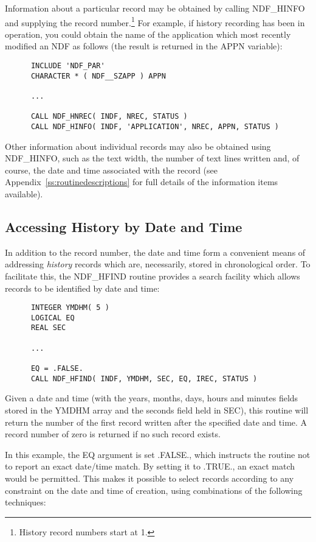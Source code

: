 \documentclass[twoside,11pt]{article}
\newcommand{\htmlref}[2]{#1}
\newcommand{\xlabel}[1]{}
\newcommand{\st}[1]{{\em{#1}}}
\begin{document}
Information about a particular record may be obtained by calling
NDF\_HINFO and supplying the record number.\footnote{History record
numbers start at 1.} For example, if history recording has been in
operation, you could obtain the name of the application which most
recently modified an NDF as follows (the result is returned in the
APPN variable):

\small
\begin{verbatim}
      INCLUDE 'NDF_PAR'
      CHARACTER * ( NDF__SZAPP ) APPN

      ...

      CALL NDF_HNREC( INDF, NREC, STATUS )
      CALL NDF_HINFO( INDF, 'APPLICATION', NREC, APPN, STATUS )
\end{verbatim}
\normalsize

Other information about individual records may also be obtained using
NDF\_HINFO, such as the text width, the number of text lines written
and, of course, the date and time associated with the record (see
Appendix~\ref{ss:routinedescriptions} for full details of the
information items available).

\subsection{\xlabel{accessing_history_by_date_and_time}Accessing History by Date and Time}

In addition to the record number, the date and time form a convenient
means of addressing \st{history\/} records which are, necessarily, stored in
chronological order. To facilitate this, the \htmlref{NDF\_HFIND}{NDF_HFIND} routine
provides a search facility which allows records to be identified by
date and time:

\small
\begin{verbatim}
      INTEGER YMDHM( 5 )
      LOGICAL EQ
      REAL SEC

      ...

      EQ = .FALSE.
      CALL NDF_HFIND( INDF, YMDHM, SEC, EQ, IREC, STATUS )
\end{verbatim}
\normalsize

Given a date and time (with the years, months, days, hours and minutes
fields stored in the YMDHM array and the seconds field held in SEC),
this routine will return the number of the first record written after
the specified date and time. A record number of zero is returned if no
such record exists.

In this example, the EQ argument is set .FALSE., which instructs the
routine not to report an exact date/time match. By setting it to
.TRUE., an exact match would be permitted. This makes it possible to
select records according to any constraint on the date and time of
creation, using combinations of the following techniques:
\end{document}
